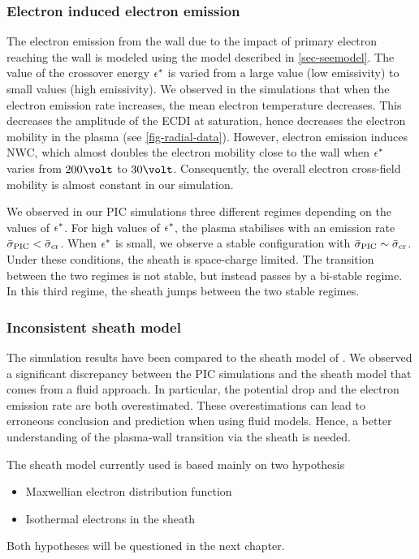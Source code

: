   
  \subsubsection*{Electron induced electron emission}
  
  The electron  emission from the wall due to the impact of primary electron reaching the wall is modeled using the model described in \cref{sec-seemodel}.
  The value of the crossover energy $\epsilon^{*}$ is varied from a large value (low emissivity) to small values (high emissivity).
  We observed in the simulations that when the electron emission rate increases, the mean electron temperature decreases.
  This decreases the amplitude of the \ac{ECDI} at saturation, hence decreases the electron mobility in the plasma (see \cref{fig-radial-data}).
  However, electron emission induces \ac{NWC}, which almost doubles the electron mobility close to the wall when $\epsilon^{*}$ varies from $200\volt$ to $30\volt$.
  Consequently, the overall electron cross-field mobility is almost constant in our simulation.
  
  We observed in our \ac{PIC} simulations three different regimes depending on the values of $\epsilon^{*}$.
  For high values of $\epsilon^{*}$, the plasma stabilises with an emission rate $ \bar{\sigma }_{\rm PIC} <  \bar{\sigma }_{\rm cr}$.
  When $\epsilon^{*}$ is small, we observe a stable configuration with $ \bar{\sigma }_{\rm PIC} \sim  \bar{\sigma }_{\rm cr}$.
  Under these conditions, the sheath is space-charge limited.
  The transition between the two regimes is not stable, but instead passes by a bi-stable regime.
  In this third regime, the sheath jumps between the two stable regimes.
  

  \subsubsection*{Inconsistent sheath model }
  
  The simulation results have been compared to the sheath model of \citet{hobbs1967}.
  We observed a significant discrepancy between the \ac{PIC} simulations and the sheath model that comes from a fluid approach.
  In particular, the potential drop and the electron emission rate are both overestimated.
  These overestimations can lead to erroneous conclusion and prediction when using fluid models.
  Hence, a better understanding of the plasma-wall transition via the sheath is needed.
  
  The sheath model currently used is based mainly on two hypothesis
  \begin{itemize}
    \item Maxwellian electron distribution function
    \item Isothermal electrons in the sheath
  \end{itemize}
  
  Both hypotheses will be questioned in the next chapter.
  
